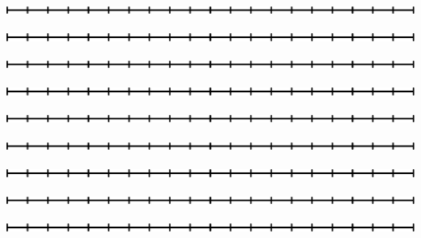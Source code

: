 \newpage
\thispagestyle{empty}
\begin{center}
		\includegraphics[]{20}
\end{center}
\vspace{2cm}
\begin{center}
	\includegraphics[]{20}
\end{center}
\vspace{2cm}
\begin{center}
	\includegraphics[]{20}
\end{center}
\vspace{2cm}
\begin{center}
	\includegraphics[]{20}
\end{center}
\vspace{2cm}
\begin{center}
	\includegraphics[]{20}
\end{center}
\vspace{2cm}
\begin{center}
	\includegraphics[]{20}
\end{center}
\vspace{2cm}
\begin{center}
	\includegraphics[]{20}
\end{center}
\vspace{2cm}
\begin{center}
	\includegraphics[]{20}
\end{center}
\vspace{2cm}
\begin{center}
	\includegraphics[]{20}
\end{center}
